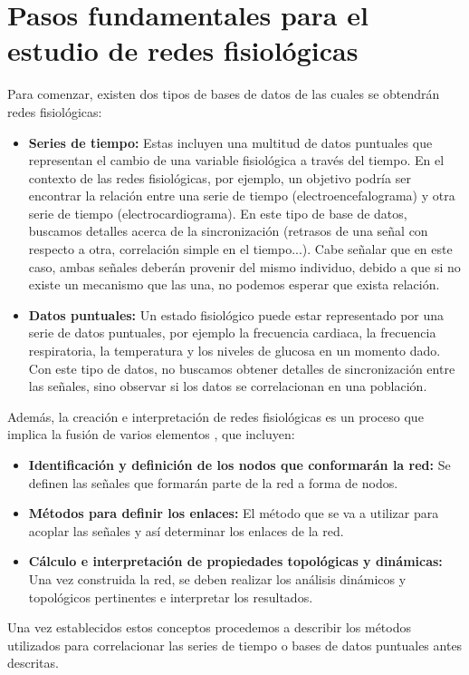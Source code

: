 \documentclass[twoside,twocolumn]{article}
\begin{document}
\section{Pasos fundamentales para el estudio de redes fisiológicas}
Para comenzar, existen dos tipos de bases de datos de las cuales se obtendrán redes fisiológicas:
\begin{itemize}
  \item \textbf{Series de tiempo:} Estas incluyen una multitud de datos puntuales que representan el cambio de una variable fisiológica a través del tiempo.
  En el contexto de las redes fisiológicas, por ejemplo, un objetivo podría ser encontrar la relación entre una serie de tiempo (electroencefalograma) y otra serie de tiempo (electrocardiograma).
  En este tipo de base de datos, buscamos detalles acerca de la sincronización (retrasos de una señal con respecto a otra, correlación simple en el tiempo...).
  Cabe señalar que en este caso, ambas señales deberán provenir del mismo individuo, debido a que si no existe un mecanismo que las una, no podemos esperar que exista relación\cite{bashan2012network}.
  \item \textbf{Datos puntuales:} Un estado fisiológico puede estar representado por una serie de datos puntuales, por ejemplo la frecuencia cardiaca, la frecuencia respiratoria, la temperatura y los niveles de glucosa en un momento dado.
  Con este tipo de datos, no buscamos obtener detalles de sincronización entre las señales, sino observar si los datos se correlacionan en una población\cite{barajas2021physiological}.
\end{itemize}
Además, la creación e interpretación de redes fisiológicas es un proceso que implica la fusión de varios elementos \cite{barajas2021sex}, que incluyen:
\begin{itemize}
  \item \textbf{Identificación y definición de los nodos que conformarán la red:} Se definen las señales que formarán parte de la red a forma de nodos.
  \item \textbf{Métodos para definir los enlaces:} El método que se va a utilizar para acoplar las señales y así determinar los enlaces de la red.
  \item \textbf{Cálculo e interpretación de propiedades topológicas y dinámicas:} Una vez construida la red, se deben realizar los análisis dinámicos y topológicos pertinentes e interpretar los resultados.
\end{itemize}

Una vez establecidos estos conceptos procedemos a describir los métodos utilizados para correlacionar las series de tiempo o bases de datos puntuales antes descritas.
\end{document}
